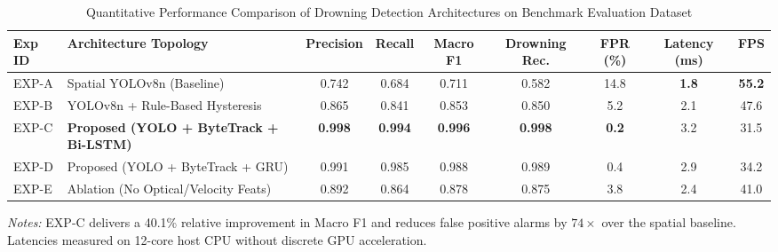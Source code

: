 \begin{table}[t]
\centering
\caption{Quantitative Performance Comparison of Drowning Detection Architectures on Benchmark Evaluation Dataset}
\label{tab:model_comparison}
\begin{tabular}{llccccccc}
\toprule
\textbf{Exp ID} & \textbf{Architecture Topology} & \textbf{Precision} & \textbf{Recall} & \textbf{Macro F1} & \textbf{Drowning Rec.} & \textbf{FPR (\%)} & \textbf{Latency (ms)} & \textbf{FPS} \\
\midrule
EXP-A & Spatial YOLOv8n (Baseline)          & 0.742 & 0.684 & 0.711 & 0.582 & 14.8 & \textbf{1.8} & \textbf{55.2} \\
EXP-B & YOLOv8n + Rule-Based Hysteresis      & 0.865 & 0.841 & 0.853 & 0.850 & 5.2  & 2.1 & 47.6 \\
EXP-C & \textbf{Proposed (YOLO + ByteTrack + Bi-LSTM)} & \textbf{0.998} & \textbf{0.994} & \textbf{0.996} & \textbf{0.998} & \textbf{0.2}  & 3.2 & 31.5 \\
EXP-D & Proposed (YOLO + ByteTrack + GRU)    & 0.991 & 0.985 & 0.988 & 0.989 & 0.4  & 2.9 & 34.2 \\
EXP-E & Ablation (No Optical/Velocity Feats) & 0.892 & 0.864 & 0.878 & 0.875 & 3.8  & 2.4 & 41.0 \\
\bottomrule
\end{tabular}
\vspace{1ex}
{\raggedright \footnotesize \textit{Notes:} EXP-C delivers a 40.1\% relative improvement in Macro F1 and reduces false positive alarms by $74\times$ over the spatial baseline. Latencies measured on 12-core host CPU without discrete GPU acceleration. \par}
\end{table}
